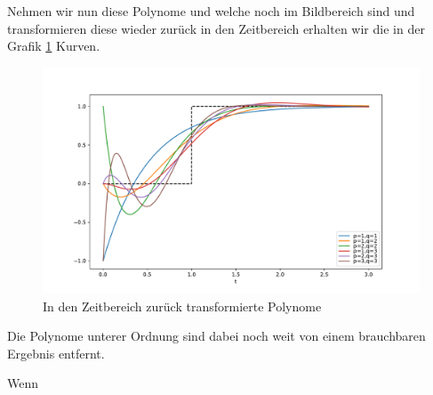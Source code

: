 Nehmen wir nun diese Polynome und welche noch im Bildbereich sind und transformieren diese wieder zurück in den Zeitbereich erhalten wir die in der Grafik \ref{pade:totzeitexp2} Kurven.
\begin{figure}
	\centering
	\includegraphics[width=1\linewidth]{./papers/pade/python/bilder/padelow33.pdf}
	\caption{In den Zeitbereich zurück transformierte Polynome \label{pade:totzeitexp2}}
\end{figure}

Die Polynome unterer Ordnung sind dabei noch weit von einem brauchbaren Ergebnis entfernt.

Wenn 












